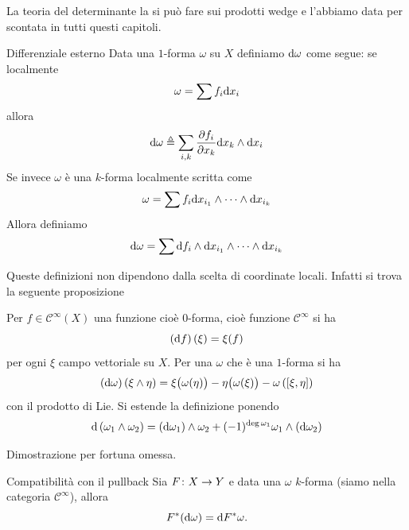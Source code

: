 \documentclass[a4paper]{article}
\begin{document}
La teoria del determinante la si può fare sui prodotti wedge e l'abbiamo data per scontata
in tutti questi capitoli.

\begin{snippetdefinition}{Differenziale esterno}
    Data una \(1\)-forma \(\omega\) su \(X\)
    definiamo \(\text d\omega\) come segue:
    se localmente \[
        \omega = \sum f_i \text dx_i
    \]
    allora \[
        \text d\omega \triangleq \sum_{i,k} \frac{\partial f_i}{\partial x_k} \text dx_k \wedge \text dx_i
    \]
    Se invece \(\omega\) è una \(k\)-forma localmente scritta come
    \[
        \omega = \sum f_i \text dx_{i_1} \wedge \cdots \wedge \text dx_{i_k}
    \]
    Allora definiamo
    \[
        \text d\omega = \sum \text d f_i \wedge \text dx_{i_1}
        \wedge \cdots \wedge \text dx_{i_k}
    \]
\end{snippetdefinition}

Queste definizioni non dipendono dalla scelta di coordinate locali.
Infatti si trova la seguente proposizione

\begin{snippetproposition}{}
    Per \(f \in \mathcal C^\infty(X)\) una funzione cioè \(0\)-forma,
    cioè funzione \(\mathcal C^\infty\) si ha
    \[
        \left(\text df\right)(\xi) = \xi(f)
    \]
    per ogni \(\xi\) campo vettoriale su \(X\).
    Per una \(\omega\) che è una \(1\)-forma si ha
    \[
        \left(\text d\omega\right)(\xi \wedge \eta)
        = \xi\bigl(\omega(\eta)\bigr)
        - \eta\bigl(\omega(\xi)\bigr)
        - \omega\left([\xi,\eta]\right)
    \]
    con il prodotto di Lie. Si estende la definizione ponendo
    \[
        \text d\left(
            \omega_1 \wedge \omega_2
        \right)
        = \left(
            \text d \omega_1
        \right)
        \wedge \omega_2
        + (-1)^{\deg\omega_1}
        \omega_1 \wedge \left(\text d\omega_2\right)
    \]
\end{snippetproposition}

Dimostrazione per fortuna omessa.

\begin{snippetproposition}{Compatibilità con il pullback}
    Sia \(F \colon X \to Y\)
    e data una \(\omega\) \(k\)-forma (siamo nella categoria \(\mathcal C^\infty\)),
    allora \[
        F^*(\text d\omega) = \text d F^*\omega .
    \]
\end{snippetproposition}
\end{document}
